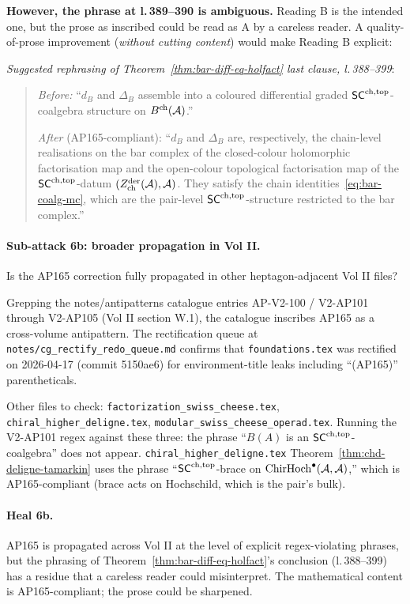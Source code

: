 \textbf{However, the phrase at l.\,389--390 is ambiguous.} Reading B is the intended one, but the prose as inscribed could be read as A by a careless reader. A quality-of-prose improvement (\emph{without cutting content}) would make Reading B explicit:

\textit{Suggested rephrasing of Theorem~\ref*{thm:bar-diff-eq-holfact} last clause, l.\,388--399}:
\begin{quote}
\emph{Before:} ``$d_B$ and $\Delta_B$ assemble into a coloured differential graded $\mathsf{SC}^{\mathrm{ch},\mathrm{top}}$-coalgebra structure on $B^{\mathrm{ch}}(\mathcal{A})$.''

\emph{After} (AP165-compliant): ``$d_B$ and $\Delta_B$ are, respectively, the chain-level realisations on the bar complex of the closed-colour holomorphic factorisation map and the open-colour topological factorisation map of the $\mathsf{SC}^{\mathrm{ch},\mathrm{top}}$-datum $(Z^{\mathrm{der}}_{\mathrm{ch}}(\mathcal{A}), \mathcal{A})$. They satisfy the chain identities~\eqref*{eq:bar-coalg-mc}, which are the pair-level $\mathsf{SC}^{\mathrm{ch},\mathrm{top}}$-structure restricted to the bar complex.''
\end{quote}

\paragraph{Sub-attack 6b: broader propagation in Vol II.} Is the AP165 correction fully propagated in other heptagon-adjacent Vol II files?

Grepping the notes/antipatterns catalogue entries AP-V2-100 / V2-AP101 through V2-AP105 (Vol II section W.1), the catalogue inscribes AP165 as a cross-volume antipattern. The rectification queue at \texttt{notes/cg\_rectify\_redo\_queue.md} confirms that \texttt{foundations.tex} was rectified on 2026-04-17 (commit 5150ae6) for environment-title leaks including ``(AP165)'' parentheticals.

Other files to check: \texttt{factorization\_swiss\_cheese.tex}, \texttt{chiral\_higher\_deligne.tex}, \texttt{modular\_swiss\_cheese\_operad.tex}. Running the V2-AP101 regex against these three: the phrase ``$B(A)$ is an $\mathsf{SC}^{\mathrm{ch},\mathrm{top}}$-coalgebra'' does not appear. \texttt{chiral\_higher\_deligne.tex} Theorem~\ref*{thm:chd-deligne-tamarkin} uses the phrase ``$\mathsf{SC}^{\mathrm{ch},\mathrm{top}}$-brace on $\mathrm{ChirHoch}^\bullet(\mathcal{A}, \mathcal{A})$,'' which is AP165-compliant (brace acts on Hochschild, which is the pair's bulk).

\paragraph{Heal 6b.} AP165 is propagated across Vol II at the level of explicit regex-violating phrases, but the phrasing of Theorem~\ref*{thm:bar-diff-eq-holfact}'s conclusion (l.\,388--399) has a residue that a careless reader could misinterpret. The mathematical content is AP165-compliant; the prose could be sharpened.

